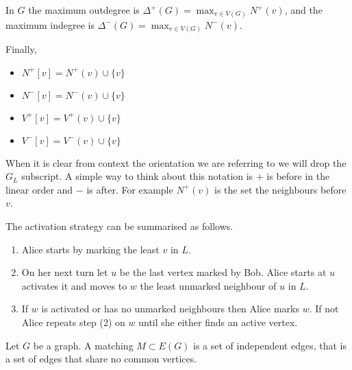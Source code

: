 In $G$ the maximum outdegree is $\Delta^+(G)=\max_{v\in V(G)}N^+(v)$, and 
the maximum indegree is $\Delta^-(G)=\max_{v\in V(G)}N^-(v)$. 

Finally,
\begin{itemize}  
    \item $N^+[v]=N^+(v)\cup\{v\}$
    \item $N^-[v]=N^-(v)\cup\{v\}$
    \item $V^+[v]=V^+(v)\cup\{v\}$
    \item $V^-[v]=V^-(v)\cup\{v\}$
\end{itemize}
When it is clear from context the orientation we are referring to we will drop the $G_L$ subscript.  A simple way to think about this notation is $+$ is before in the linear order and $-$ is after. For example $N^+(v)$ is the set the neighbours before $v$.

The activation strategy can be  summarised as follows. 
\begin{enumerate}
    \item Alice starts by marking the least $v$ in $L$.
    \item On her next turn let $u$ be the last vertex marked by Bob. Alice starts at $u$ activates it and moves to $w$ the least unmarked neighbour of $u$ in $L$.
    \item If $w$ is activated or has no unmarked neighbours then Alice marks $w$. If not Alice repeats step (2) on $w$ until she either finds an active vertex.
\end{enumerate}


\begin{definition}[Matching]
    Let $G$ be a graph. A matching $M\subset E(G)$ is a set of independent edges, that is a set of edges that share no common vertices. 
\end{definition}

